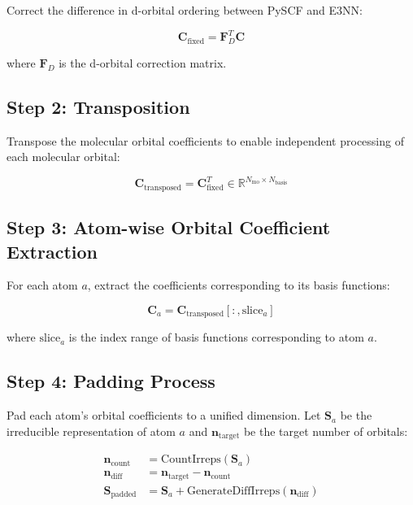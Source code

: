 \documentclass[12pt]{article}
\begin{document}
Correct the difference in d-orbital ordering between PySCF and E3NN:

\begin{equation}
\mathbf{C}_{\text{fixed}} = \mathbf{F}_D^T \mathbf{C}
\end{equation}

where $\mathbf{F}_D$ is the d-orbital correction matrix.

\subsection{Step 2: Transposition}

Transpose the molecular orbital coefficients to enable independent processing of each molecular orbital:

\begin{equation}
\mathbf{C}_{\text{transposed}} = \mathbf{C}_{\text{fixed}}^T \in \mathbb{R}^{N_{\text{mo}} \times N_{\text{basis}}}
\end{equation}

\subsection{Step 3: Atom-wise Orbital Coefficient Extraction}

For each atom $a$, extract the coefficients corresponding to its basis functions:

\begin{equation}
\mathbf{C}_a = \mathbf{C}_{\text{transposed}}[:, \text{slice}_a]
\end{equation}

where $\text{slice}_a$ is the index range of basis functions corresponding to atom $a$.

\subsection{Step 4: Padding Process}

Pad each atom's orbital coefficients to a unified dimension. Let $\mathbf{S}_a$ be the irreducible representation of atom $a$ and $\mathbf{n}_{\text{target}}$ be the target number of orbitals:

\begin{align}
\mathbf{n}_{\text{count}} &= \text{CountIrreps}(\mathbf{S}_a) \\
\mathbf{n}_{\text{diff}} &= \mathbf{n}_{\text{target}} - \mathbf{n}_{\text{count}} \\
\mathbf{S}_{\text{padded}} &= \mathbf{S}_a + \text{GenerateDiffIrreps}(\mathbf{n}_{\text{diff}})
\end{align}
\end{document}
